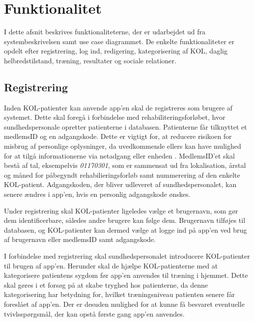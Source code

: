 \section{Funktionalitet}
I dette afsnit beskrives funktionaliteterne, der er udarbejdet ud fra systembeskrivelsen samt use case diagrammet. De enkelte funktionaliteter er opdelt efter registrering, log ind, redigering, kategorisering af KOL, daglig helbredstilstand, træning, resultater og sociale relationer. 

\subsection*{Registrering} \label{sec:registrering}
Inden KOL-patienter kan anvende app'en skal de registreres som brugere af systemet. Dette skal foregå i forbindelse med rehabiliteringsforløbet, hvor sundhedspersonale opretter patienterne i databasen. Patienterne får tilknyttet et medlemsID og en adgangskode. Dette er vigtigt for, at reducere risikoen for misbrug af personlige oplysninger, da uvedkommende ellers kan have mulighed for at tilgå informationerne via netadgang eller enheden \cite{Sundhedsdatastyrelsen2016}. MedlemsID'et skal bestå af tal, eksempelvis \textit{01170301}, som er sammensat ud fra lokalisation, årstal og måned for påbegyndt rehabilieringsforløb samt nummerering af den enkelte KOL-patient.
Adgangskoden, der bliver udleveret af sundhedspersonalet, kan senere ændres i app'en, hvis en personlig adgangskode ønskes. 

Under registrering skal KOL-patienter ligeledes vælge et brugernavn, som gør dem identificerbare, således andre brugere kan følge dem. Brugernavn tilføjes til databasen, og KOL-patienter kan dermed vælge at logge ind på app'en ved brug af brugernavn eller  medlemsID samt adgangskode. 

I forbindelse med registrering skal sundhedspersonalet introducere KOL-patienter til brugen af app'en. Herunder skal de hjælpe KOL-patienterne med at kategorisere patientens sygdom før app'en anvendes til træning i hjemmet. Dette skal gøres i et forsøg på at skabe tryghed hos patienterne, da denne kategorisering har betydning for, hvilket træningsniveau patienten senere får foreslået af app'en. Der er desuden mulighed for at kunne få besvaret eventuelle tvivlsspørgsmål, der kan opstå første gang app'en anvendes. 


